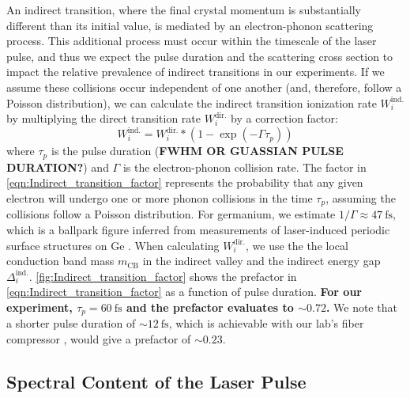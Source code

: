 An indirect transition, where the final crystal momentum is substantially different than its initial value, is mediated by an electron-phonon scattering process. This additional process must occur within the timescale of the laser pulse, and thus we expect the pulse duration and the scattering cross section to impact the relative prevalence of indirect transitions in our experiments. If we assume these collisions occur independent of one another (and, therefore, follow a Poisson distribution), we can calculate the indirect transition ionization rate $W_i^{\textrm{ind.}}$ by multiplying the direct transition rate $W_i^{\textrm{dir.}}$ by a correction factor:
\begin{equation}
W_i^{\textrm{ind.}} = W_i^{\textrm{dir.}} * (1 - \exp(-\Gamma \tau_p))
\label{eqn:Indirect_transition_factor}
\end{equation}
where $\tau_p$ is the pulse duration (\textbf{FWHM OR GUASSIAN PULSE DURATION?}) and $\Gamma$ is the electron-phonon collision rate. The factor in \cref{eqn:Indirect_transition_factor} represents the probability that any given electron will undergo one or more phonon collisions in the time $\tau_p$, assuming the collisions follow a Poisson distribution. For germanium, we estimate $1/\Gamma \approx 47 \ \textrm{fs}$, which is a ballpark figure inferred from measurements of laser-induced periodic surface structures on Ge \cite{austinSemiconductorSurfaceModification2017}. When calculating $W_i^{\textrm{dir.}}$, we use the the local conduction band mass $m_{\textrm{CB}}$ in the indirect valley and the indirect energy gap $\Delta_i^{\textrm{ind.}}$. \cref{fig:Indirect_transition_factor} shows the prefactor in \cref{eqn:Indirect_transition_factor} as a function of pulse duration. \textbf{For our experiment, $\tau_p = 60 \ \textrm{fs}$ and the prefactor evaluates to $\sim 0.72$.} We note that a shorter pulse duration of $\sim 12 \ \textrm{fs}$, which is achievable with our lab's fiber compressor \cite{zhangAtomicMolecularDynamics2015}, would give a prefactor of $\sim 0.23$.

\subsection{Spectral Content of the Laser Pulse}
\label{sec:bandwidth_of_pulse}

